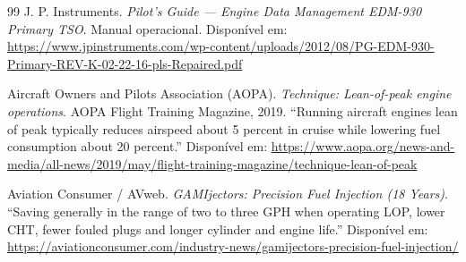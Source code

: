 \documentclass[a4paper,12pt]{article}
\begin{document}
\begin{thebibliography}{99}
    J. P. Instruments. \textit{Pilot's Guide --- Engine Data Management EDM-930 Primary TSO}. Manual operacional. Disponível em: \url{https://www.jpinstruments.com/wp-content/uploads/2012/08/PG-EDM-930-Primary-REV-K-02-22-16-pls-Repaired.pdf}

    Aircraft Owners and Pilots Association (AOPA). \textit{Technique: Lean-of-peak engine operations}. AOPA Flight Training Magazine, 2019. ``Running aircraft engines lean of peak typically reduces airspeed about 5 percent in cruise while lowering fuel consumption about 20 percent.'' Disponível em: \url{https://www.aopa.org/news-and-media/all-news/2019/may/flight-training-magazine/technique-lean-of-peak}

    Aviation Consumer / AVweb. \textit{GAMIjectors: Precision Fuel Injection (18 Years)}. ``Saving generally in the range of two to three GPH when operating LOP, lower CHT, fewer fouled plugs and longer cylinder and engine life.'' Disponível em: \url{https://aviationconsumer.com/industry-news/gamijectors-precision-fuel-injection/}

\end{thebibliography}
\end{document}
